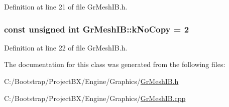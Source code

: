 Definition at line 21 of file GrMeshIB.h.\hypertarget{class_gr_mesh_i_b_e4996627a2e477914d1b15e38d118885}{
\subsubsection[{kNoCopy}]{\setlength{\rightskip}{0pt plus 5cm}const unsigned int {\bf GrMeshIB::kNoCopy} = 2}}
\label{class_gr_mesh_i_b_e4996627a2e477914d1b15e38d118885}




Definition at line 22 of file GrMeshIB.h.

The documentation for this class was generated from the following files:\begin{CompactItemize}
\item 
C:/Bootstrap/ProjectBX/Engine/Graphics/\hyperlink{_gr_mesh_i_b_8h}{GrMeshIB.h}\item 
C:/Bootstrap/ProjectBX/Engine/Graphics/\hyperlink{_gr_mesh_i_b_8cpp}{GrMeshIB.cpp}\end{CompactItemize}
